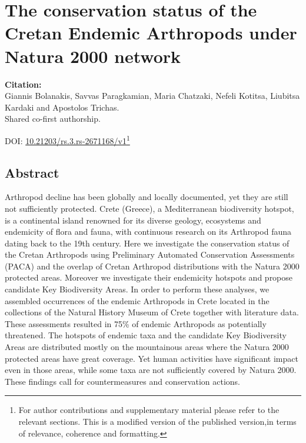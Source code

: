 % 
% 


\chapter{The conservation status of the Cretan Endemic Arthropods under Natura 2000 network}
\label{cha:arthropods}


\textbf{Citation:} \\ 
Giannis Bolanakis, Savvas Paragkamian, Maria Chatzaki, Nefeli Kotitsa, Liubitsa Kardaki and Apostolos Trichas.\\

Shared co-first authorship.

DOI: \href{https://doi.org/10.21203/rs.3.rs-2671168/v1}{10.21203/rs.3.rs-2671168/v1}\footnote{
   For author contributions and supplementary material please refer to the relevant sections. 
   This is a modified version of the published version,in terms of relevance, coherence and formatting.}



\section{Abstract}

Arthropod decline has been globally and locally documented, yet they are still
not sufficiently protected. Crete (Greece), a Mediterranean biodiversity
hotspot, is a continental island renowned for its diverse geology, ecosystems
and endemicity of flora and fauna, with continuous research on its Arthropod
fauna dating back to the 19th century. Here we investigate the conservation
status of the Cretan Arthropods using Preliminary Automated Conservation
Assessments (PACA) and the overlap of Cretan Arthropod distributions with the
Natura 2000 protected areas. Moreover we investigate their endemicity hotspots
and propose candidate Key Biodiversity Areas. In order to perform these
analyses, we assembled occurrences of the endemic Arthropods in Crete located
in the collections of the Natural History Museum of Crete together with
literature data. These assessments resulted in 75\% of endemic Arthropods as
potentially threatened. The hotspots of endemic taxa and the candidate Key
Biodiversity Areas are distributed mostly on the mountainous areas where the
Natura 2000 protected areas have great coverage. Yet human activities have
significant impact even in those areas, while some taxa are not sufficiently
covered by Natura 2000. These findings call for countermeasures and conservation actions.


